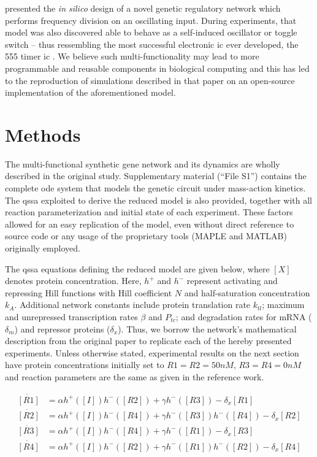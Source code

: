   \citet{multif} presented the \textit{in silico} design of a novel genetic regulatory network which performs frequency division on an oscillating input.
  During experiments, that model was also discovered able to behave as a self-induced oscillator or toggle switch -- thus ressembling the most successful electronic \ac{ic} ever developed, the 555 timer \acs{ic} \cite{ic555}.
  We believe such multi-functionality may lead to more programmable and reusable components in biological computing and this has led to the reproduction of simulations described in that paper on an open-source implementation of the aforementioned model.


\section{Methods}

  The multi-functional synthetic gene network and its dynamics are wholly described in the original study.
  Supplementary material (``File S1'') contains the complete \ac{ode} system that models the genetic circuit under mass-action kinetics.
  The \ac{qssa} exploited to derive the reduced model is also provided, together with all reaction parameterization and initial state of each experiment.
  These factors allowed for an easy replication of the model, even without direct reference to source code or any usage of the proprietary tools (MAPLE and MATLAB) originally employed.

  The \ac{qssa} equations defining the reduced model are given below, where $[X]$ denotes protein concentration.
  Here, $h^+$ and $h^-$ represent activating and repressing Hill functions with Hill coefficient $N$ and half-saturation concentration $k_A$.
  Additional network constants include protein translation rate $k_{tl}$; maximum and unrepressed transcription rates $\beta$ and $P_{tc}$; and degradation rates for mRNA ($\delta_m$) and repressor proteins ($\delta_x$).
  Thus, we borrow the network's mathematical description from the original paper to replicate each of the hereby presented experiments.
  Unless otherwise stated, experimental results on the next section have protein concentrations initially set to $R1 = R2 = 50nM$, $R3 = R4 = 0nM$ and reaction parameters are the same as given in the reference work.

  \begin{equation*}\label{eq:qssa}
    \begin{aligned}
      \dot{[R1]} &= \alpha h^+([I]) h^-([R2]) + \gamma h^-([R3])           - \delta_x [R1] \\
      \dot{[R2]} &= \alpha h^+([I]) h^-([R4]) + \gamma h^-([R3]) h^-([R4]) - \delta_x [R2] \\
      \dot{[R3]} &= \alpha h^+([I]) h^-([R4]) + \gamma h^-([R1])           - \delta_x [R3] \\
      \dot{[R4]} &= \alpha h^+([I]) h^-([R2]) + \gamma h^-([R1]) h^-([R2]) - \delta_x [R4] \\
    \end{aligned}
  \end{equation*}

